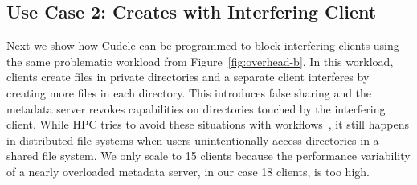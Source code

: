 %
%
%
%
%
%
%
%
%
%
%

\subsection{Use Case 2: Creates with Interfering Client}

Next we show how Cudele can be programmed to block interfering clients using
the same problematic workload from Figure~\ref{fig:overhead-b}. In this
workload, clients create files in private directories and a separate client
interferes by creating more files in each directory. This introduces false
sharing and the metadata server revokes capabilities on directories touched by
the interfering client. While HPC tries to avoid these situations with
workflows~\cite{zheng:pdsw2014-batchfs, zheng:pdsw2015-deltafs}, it still
happens in distributed file systems when users unintentionally access
directories in a shared file system.  We only scale to 15 clients because the
performance variability of a nearly overloaded metadata server, in our case 18
clients, is too high.


